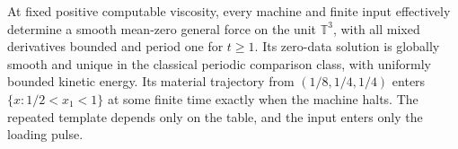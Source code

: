 \begin{theorem}\label{thm:sa-interleaved}
At fixed positive computable viscosity, every machine and finite input
effectively determine a smooth mean-zero general force on the unit
$\mathbb T^3$, with all mixed derivatives bounded and period one for
$t\ge1$.  Its zero-data solution is globally smooth and unique in the
classical periodic comparison class, with uniformly bounded kinetic
energy.  Its material trajectory from $(1/8,1/4,1/4)$ enters
$\{x:1/2<x_1<1\}$ at some finite time exactly when the machine halts.
The repeated template depends only on the table, and the input enters
only the loading pulse.
\end{theorem}
